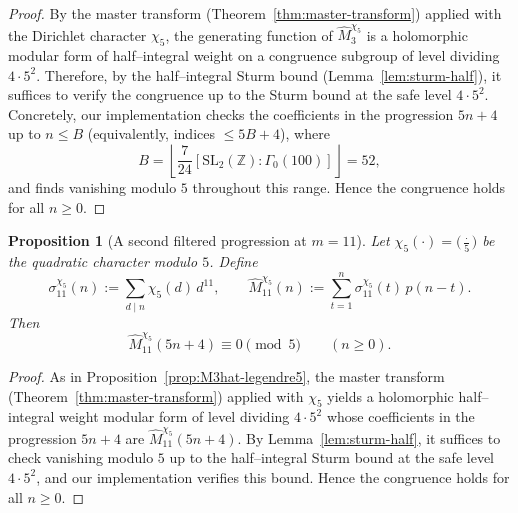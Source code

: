 \documentclass[11pt]{article}
\newtheorem{proposition}[theorem]{Proposition}
\theoremstyle{definition}
\theoremstyle{remark}
\begin{document}
\begin{proof}
By the master transform (Theorem~\ref{thm:master-transform}) applied with the
Dirichlet character $\chi_5$, the generating function of
$\widehat{M}^{\chi_5}_3$ is a holomorphic modular form of half--integral weight
on a congruence subgroup of level dividing $4\cdot 5^2$.  Therefore, by the
half--integral Sturm bound (Lemma~\ref{lem:sturm-half}), it suffices to verify
the congruence up to the Sturm bound at the safe level $4\cdot 5^2$.
Concretely, our implementation checks the coefficients in the progression
$5n+4$ up to $n\le B$ (equivalently, indices $\le 5B+4$), where
\[
B=\left\lfloor \frac{7}{24}\left[\mathrm{SL}_2(\mathbb{Z}):\Gamma_0(100)\right]\right\rfloor
=52,
\]
and finds vanishing modulo $5$ throughout this range.  Hence the congruence
holds for all $n\ge0$.
\end{proof}

\begin{proposition}[A second filtered progression at $m=11$]\label{prop:M11hat-legendre5}
Let $\chi_5(\cdot)=\big(\frac{\cdot}{5}\big)$ be the quadratic character modulo
$5$.  Define
\[
\sigma^{\chi_5}_{11}(n):=\sum_{d\mid n}\chi_5(d)\,d^{11},
\qquad
\widehat{M}^{\chi_5}_{11}(n):=\sum_{t=1}^{n}\sigma^{\chi_5}_{11}(t)\,p(n-t).
\]
Then
\[
\widehat{M}^{\chi_5}_{11}(5n+4)\equiv 0\pmod{5}\qquad(n\ge 0).
\]
\end{proposition}

\begin{proof}
As in Proposition~\ref{prop:M3hat-legendre5}, the master transform
(Theorem~\ref{thm:master-transform}) applied with $\chi_5$ yields a holomorphic
half--integral weight modular form of level dividing $4\cdot 5^2$ whose
coefficients in the progression $5n+4$ are $\widehat{M}^{\chi_5}_{11}(5n+4)$.
By Lemma~\ref{lem:sturm-half}, it suffices to check vanishing modulo $5$ up to
the half--integral Sturm bound at the safe level $4\cdot 5^2$, and our
implementation verifies this bound.  Hence the congruence holds for all $n\ge0$.
\end{proof}
\end{document}
